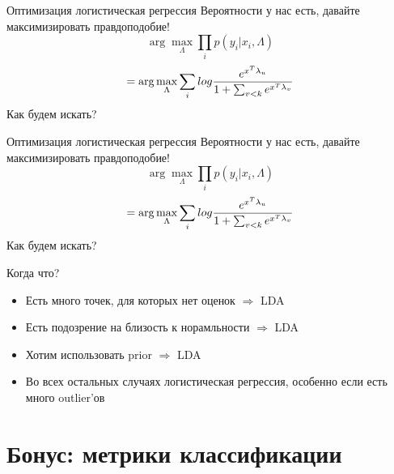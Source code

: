 \documentclass[14pt, fleqn, xcolor={dvipsnames, table}]{beamer}
\begin{document}
\begin{frame}{Оптимизация логистическая регрессия}
Вероятности у нас есть, давайте максимизировать правдоподобие!
$$
\arg \max_\Lambda \prod_i p(y_i|x_i, \Lambda)
$$
$$
= \arg \max_\Lambda \sum_i log {e^{x^T \lambda_{u}} \over 1 + \sum_{v < k} e^{x^T\lambda_v}}
$$
Как будем искать?
\end{frame}

\begin{frame}{Оптимизация логистическая регрессия}
Вероятности у нас есть, давайте максимизировать правдоподобие!
$$
\arg \max_\Lambda \prod_i p(y_i|x_i, \Lambda)
$$
$$
= \arg \max_\Lambda \sum_i log {e^{x^T \lambda_{u}} \over 1 + \sum_{v < k} e^{x^T\lambda_v}}
$$
Как будем искать?
\end{frame}

\begin{frame}{Когда что?}
\begin{itemize}
  \item Есть много точек, для которых нет оценок $\Rightarrow$ LDA
  \item Есть подозрение на близость к норамльности $\Rightarrow$ LDA
  \item Хотим использовать prior $\Rightarrow$ LDA
  \item Во всех остальных случаях логистическая регрессия, особенно если есть много outlier'ов
\end{itemize}
\end{frame}

\section{Бонус: метрики классификации}
\end{document}

